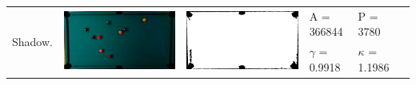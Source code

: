 \begin{tabular}{|l|c|c|l|l|c|}
\multirow{2}{*}{Shadow.} & \multirow{2}{*}{\includegraphics[scale=0.05]{../images/1/6_img.png}} & \multirow{2}{*}{\includegraphics[scale=0.05]{../images/1/6_mask.png}} & A = 366844 & P = 3780 & \multirow{2}{*}{}\\ 
& & & $\gamma$ = 0.9918 & $\kappa$ = 1.1986 & \\
\hline


\end{tabular}
